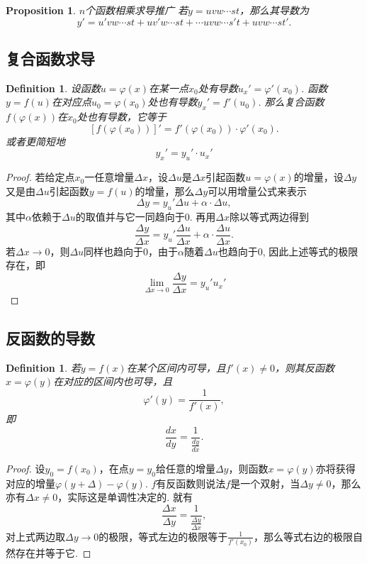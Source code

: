 \documentclass{article}
\newtheorem{proposition}[theorem]{Proposition}
\newtheorem{definition}[theorem]{Definition}
\begin{document}
\begin{proposition}
\rm {\color{red} $n$个函数相乘求导推广} 若$y = uvw\cdots st$，那么其导数为
$$
y' = u'vw\cdots st + uv'w\cdots st + \cdots uvw\cdots s't + uvw\cdots s t'.
$$
\end{proposition}

\subsection{复合函数求导}

\begin{definition}
\rm 设函数$u=\varphi(x)$在某一点$x_0$处有导数$u_x' = \varphi'(x_0)$. 函数$y=f(u)$在对应点$u_0 = \varphi(x_0)$处也有导数$y_x' = f'(u_0)$. 那么复合函数$f(\varphi(x))$在$x_0$处也有导数，它等于
$$
\left[ f(\varphi(x_0))\right]' =  f'(\varphi(x_0)) \cdot \varphi'(x_0).
$$
或者更简短地
$$
y_x' = y_u' \cdot u_x'
$$
\end{definition}

\begin{proof}
若给定点$x_0$一任意增量$\Delta x$，设$\Delta u$是$\Delta x$引起函数$u=\varphi(x)$的增量，设$\Delta y$又是由$\Delta u$引起函数$y=f(u)$的增量，那么$\Delta y$可以用增量公式来表示
$$
\Delta y = y_u' \Delta u + \alpha \cdot \Delta u,
$$
其中$\alpha$依赖于$\Delta u$的取值并与它一同趋向于$0$. 再用$\Delta x$除以等式两边得到
$$
\frac{\Delta y}{\Delta x} = y_u'\frac{\Delta u}{\Delta x} + \alpha \cdot \frac{\Delta u}{\Delta x}.
$$
若$\Delta x \rightarrow 0$，则$\Delta u$同样也趋向于$0$，由于$\alpha$随着$\Delta u$也趋向于$0$, 因此上述等式的极限存在，即
$$
\lim\limits_{\Delta x \rightarrow 0} \frac{\Delta y}{\Delta x} = y_u' u_x'
$$
\end{proof}

\subsection{反函数的导数}

\begin{definition}
\rm 若$y=f(x)$在某个区间内可导，且$f'(x) \neq 0$，则其反函数$x = \varphi(y)$在对应的区间内也可导，且
$$
\varphi'(y) = \frac{1}{f'(x)},
$$
即
$$
\frac{dx}{dy} = \frac{1}{\frac{dy}{dx}}. 
$$
\end{definition}

\begin{proof}
设$y_0=f(x_0)$，在点$y=y_0$给任意的增量$\Delta y$，则函数$x=\varphi(y)$亦将获得对应的增量$\varphi(y+\Delta)-\varphi(y)$. $f$有反函数则说法$f$是一个双射，当$\Delta y \neq 0$，那么亦有$\Delta x \neq 0$，实际这是单调性决定的. 就有
$$
\frac{\Delta x}{\Delta y} = \frac{1}{\frac{\Delta y}{\Delta x}},
$$
对上式两边取$\Delta y \to 0$的极限，等式左边的极限等于$\frac{1}{f'(x_0)}$，那么等式右边的极限自然存在并等于它. 
\end{proof}
\end{document}
